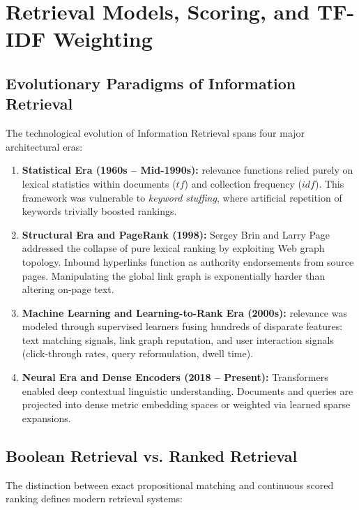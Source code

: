 \chapter{Retrieval Models, Scoring, and TF-IDF Weighting}
\label{chap:retrieval-models-tfidf}
\label{chap:retrieval-models-scoring-en}

\FloatBarrier
\section{Evolutionary Paradigms of Information Retrieval}
\label{sec:evolution-ir-en}

The technological evolution of Information Retrieval spans four major architectural eras:

\begin{enumerate}
    \item \textbf{Statistical Era (1960s -- Mid-1990s):} relevance functions relied purely on lexical statistics within documents ($tf$) and collection frequency ($idf$). This framework was vulnerable to \textit{keyword stuffing}, where artificial repetition of keywords trivially boosted rankings.
    \item \textbf{Structural Era and PageRank (1998):} Sergey Brin and Larry Page addressed the collapse of pure lexical ranking by exploiting Web graph topology. Inbound hyperlinks function as authority endorsements from source pages. Manipulating the global link graph is exponentially harder than altering on-page text.
    \item \textbf{Machine Learning and Learning-to-Rank Era (2000s):} relevance was modeled through supervised learners fusing hundreds of disparate features: text matching signals, link graph reputation, and user interaction signals (click-through rates, query reformulation, dwell time).
    \item \textbf{Neural Era and Dense Encoders (2018 -- Present):} Transformers enabled deep contextual linguistic understanding. Documents and queries are projected into dense metric embedding spaces or weighted via learned sparse expansions.
\end{enumerate}

\FloatBarrier
\section{Boolean Retrieval vs. Ranked Retrieval}
\label{sec:boolean-vs-ranked-en}

The distinction between exact propositional matching and continuous scored ranking defines modern retrieval systems:

